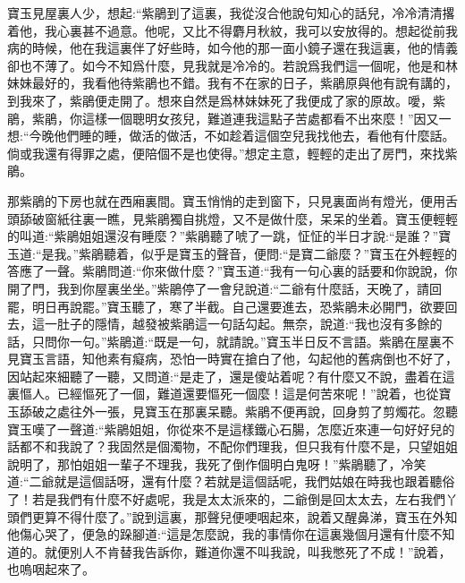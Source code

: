 \begin{parag}
    寶玉見屋裏人少，想起:“紫鵑到了這裏，我從沒合他說句知心的話兒，冷冷清清撂着他，我心裏甚不過意。他呢，又比不得麝月秋紋，我可以安放得的。想起從前我病的時候，他在我這裏伴了好些時，如今他的那一面小鏡子還在我這裏，他的情義卻也不薄了。如今不知爲什麼，見我就是冷冷的。若說爲我們這一個呢，他是和林妹妹最好的，我看他待紫鵑也不錯。我有不在家的日子，紫鵑原與他有說有講的，到我來了，紫鵑便走開了。想來自然是爲林妹妹死了我便成了家的原故。噯，紫鵑，紫鵑，你這樣一個聰明女孩兒，難道連我這點子苦處都看不出來麼！”因又一想:“今晚他們睡的睡，做活的做活，不如趁着這個空兒我找他去，看他有什麼話。倘或我還有得罪之處，便陪個不是也使得。”想定主意，輕輕的走出了房門，來找紫鵑。
\end{parag}


\begin{parag}
    那紫鵑的下房也就在西廂裏間。寶玉悄悄的走到窗下，只見裏面尚有燈光，便用舌頭舔破窗紙往裏一瞧，見紫鵑獨自挑燈，又不是做什麼，呆呆的坐着。寶玉便輕輕的叫道:“紫鵑姐姐還沒有睡麼？”紫鵑聽了唬了一跳，怔怔的半日才說:“是誰？”寶玉道:“是我。”紫鵑聽着，似乎是寶玉的聲音，便問:“是寶二爺麼？”寶玉在外輕輕的答應了一聲。紫鵑問道:“你來做什麼？”寶玉道:“我有一句心裏的話要和你說說，你開了門，我到你屋裏坐坐。”紫鵑停了一會兒說道:“二爺有什麼話，天晚了，請回罷，明日再說罷。”寶玉聽了，寒了半截。自己還要進去，恐紫鵑未必開門，欲要回去，這一肚子的隱情，越發被紫鵑這一句話勾起。無奈，說道:“我也沒有多餘的話，只問你一句。”紫鵑道:“既是一句，就請說。”寶玉半日反不言語。紫鵑在屋裏不見寶玉言語，知他素有癡病，恐怕一時實在搶白了他，勾起他的舊病倒也不好了，因站起來細聽了一聽，又問道:“是走了，還是傻站着呢？有什麼又不說，盡着在這裏慪人。已經慪死了一個，難道還要慪死一個麼！這是何苦來呢！”說着，也從寶玉舔破之處往外一張，見寶玉在那裏呆聽。紫鵑不便再說，回身剪了剪燭花。忽聽寶玉嘆了一聲道:“紫鵑姐姐，你從來不是這樣鐵心石腸，怎麼近來連一句好好兒的話都不和我說了？我固然是個濁物，不配你們理我，但只我有什麼不是，只望姐姐說明了，那怕姐姐一輩子不理我，我死了倒作個明白鬼呀！”紫鵑聽了，冷笑道:“二爺就是這個話呀，還有什麼？若就是這個話呢，我們姑娘在時我也跟着聽俗了！若是我們有什麼不好處呢，我是太太派來的，二爺倒是回太太去，左右我們丫頭們更算不得什麼了。”說到這裏，那聲兒便哽咽起來，說着又醒鼻涕，寶玉在外知他傷心哭了，便急的跺腳道:“這是怎麼說，我的事情你在這裏幾個月還有什麼不知道的。就便別人不肯替我告訴你，難道你還不叫我說，叫我憋死了不成！”說着，也嗚咽起來了。
\end{parag}


